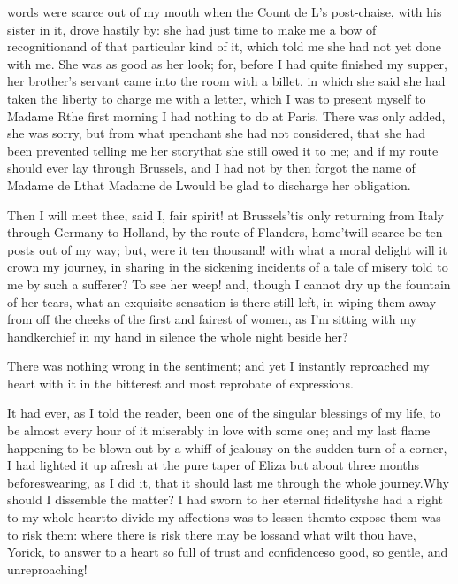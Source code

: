 \documentclass[twoside]{article}
\begin{document}
 words were scarce out of my mouth when the Count de L\tsk ’s post-chaise,
with his sister in it, drove hastily by: she had just time to make me a
bow of recognition\tsk and of that particular kind of it, which told me she
had not yet done with me.  She was as good as her look; for, before I had
quite finished my supper, her brother’s servant came into the room with a
billet, in which she said she had taken the liberty to charge me with a
letter, which I was to present myself to Madame R\tsk  the first morning I
had nothing to do at Paris.  There was only added, she was sorry, but
from what \i{penchant} she had not considered, that she had been prevented
telling me her story\tsk that she still owed it to me; and if my route
should ever lay through Brussels, and I had not by then forgot the name
of Madame de L\tsk \tsk that Madame de L\tsk  would be glad to discharge her
obligation.

Then I will meet thee, said I, fair spirit! at Brussels\tsk ’tis only
returning from Italy through Germany to Holland, by the route of
Flanders, home\tsk ’twill scarce be ten posts out of my way; but, were it
ten thousand! with what a moral delight will it crown my journey, in
sharing in the sickening incidents of a tale of misery told to me by such
a sufferer?  To see her weep! and, though I cannot dry up the fountain of
her tears, what an exquisite sensation is there still left, in wiping
them away from off the cheeks of the first and fairest of women, as I’m
sitting with my handkerchief in my hand in silence the whole night beside
her?

There was nothing wrong in the sentiment; and yet I instantly reproached
my heart with it in the bitterest and most reprobate of expressions.

It had ever, as I told the reader, been one of the singular blessings of
my life, to be almost every hour of it miserably in love with some one;
and my last flame happening to be blown out by a whiff of jealousy on the
sudden turn of a corner, I had lighted it up afresh at the pure taper of
Eliza but about three months before\tsk swearing, as I did it, that it
should last me through the whole journey.\tsk Why should I dissemble the
matter?  I had sworn to her eternal fidelity\tsk she had a right to my whole
heart\tsk to divide my affections was to lessen them\tsk to expose them was to
risk them: where there is risk there may be loss\tsk and what wilt thou
have, Yorick, to answer to a heart so full of trust and confidence\tsk so
good, so gentle, and unreproaching!
\end{document}
